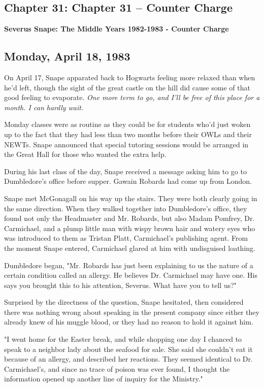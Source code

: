\documentclass[a4paper,11pt]{article}
\begin{document}
\subsection{Chapter 31: Chapter 31 – Counter Charge}

\textbf{Severus Snape: The Middle Years 1982-1983 - Counter Charge}

\subsection{Monday, April 18, 1983}

On April 17, Snape apparated back to Hogwarts feeling more relaxed than when he'd left, though the sight of the great castle on the hill did cause some of that good feeling to evaporate. \emph{One more term to go, and I'll be free of this place for a month. I can hardly wait.}

Monday classes were as routine as they could be for students who'd just woken up to the fact that they had less than two months before their OWLs and their NEWTs. Snape announced that special tutoring sessions would be arranged in the Great Hall for those who wanted the extra help.

During his last class of the day, Snape received a message asking him to go to Dumbledore's office before supper. Gawain Robards had come up from London.

Snape met McGonagall on his way up the stairs. They were both clearly going in the same direction. When they walked together into Dumbledore's office, they found not only the Headmaster and Mr. Robards, but also Madam Pomfrey, Dr. Carmichael, and a plump little man with wispy brown hair and watery eyes who was introduced to them as Tristan Platt, Carmichael's publishing agent. From the moment Snape entered, Carmichael glared at him with undisguised loathing.

Dumbledore began, "Mr. Robards has just been explaining to us the nature of a certain condition called an allergy. He believes Dr. Carmichael may have one. His says you brought this to his attention, Severus. What have you to tell us?"

Surprised by the directness of the question, Snape hesitated, then considered there was nothing wrong about speaking in the present company since either they already knew of his muggle blood, or they had no reason to hold it against him.

"I went home for the Easter break, and while shopping one day I chanced to speak to a neighbor lady about the seafood for sale. She said she couldn't eat it because of an allergy, and described her reactions. They seemed identical to Dr. Carmichael's, and since no trace of poison was ever found, I thought the information opened up another line of inquiry for the Ministry."
\end{document}
